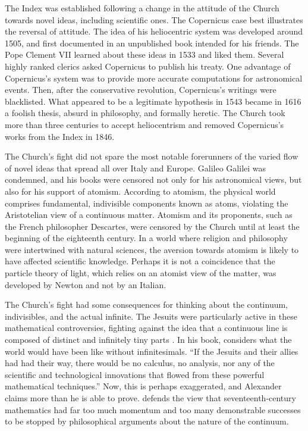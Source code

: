 The Index was established following a change in the attitude of the Church towards novel ideas, including scientific ones. The Copernicus case best illustrates the reversal of attitude. The idea of his heliocentric system was developed around 1505, and first documented in an unpublished book intended for his friends. The Pope Clement VII learned about these ideas in 1533 and liked them. Several highly ranked clerics asked Copernicus to publish his treaty. One advantage of Copernicus's system was to provide more accurate computations for astronomical events. Then, after the conservative revolution, Copernicus's writings were blacklisted. What appeared to be a legitimate hypothesis in 1543 became in 1616 a foolish thesis, absurd in philosophy, and formally heretic. The Church took more than three centuries to accept heliocentrism and removed Copernicus's works from the Index in 1846.

The Church's fight did not spare the most notable forerunners of the varied flow of novel ideas that spread all over Italy and Europe. Galileo Galilei was condemned, and his books were censored not only for his astronomical views, but also for his support of atomism. According to atomism, the physical world comprises fundamental, indivisible components known as atoms, violating the Aristotelian view of a continuous matter. Atomism and its proponents, such as the French philosopher Descartes, were censored by the Church until at least the beginning of the eighteenth century. In a world where religion and philosophy were intertwined with natural sciences, the aversion towards atomism is likely to have affected scientific knowledge. Perhaps it is not a coincidence that the particle theory of light, which relies on an atomist view of the matter, was developed by Newton and not by an Italian.

The Church's fight had some consequences for thinking about the continuum,  indivisibles, and the actual infinite. The Jesuits were particularly active in these mathematical controversies, fighting against the idea that a continuous line is composed of distinct and infinitely tiny parts  \cite{alexander2014infinitesimal}.
In his book,  considers what the world would have been like without infinitesimals. ``If the Jesuits and their allies had had their way, there would be no calculus, no analysis, nor any of the scientific and technological innovations that flowed from these powerful mathematical techniques.''
Now, this is perhaps exaggerated, and Alexander claims more than he is able to prove.  defends the view that seventeenth-century mathematics had far too much momentum and too many demonstrable successes to be stopped by philosophical arguments about the nature of the continuum.

